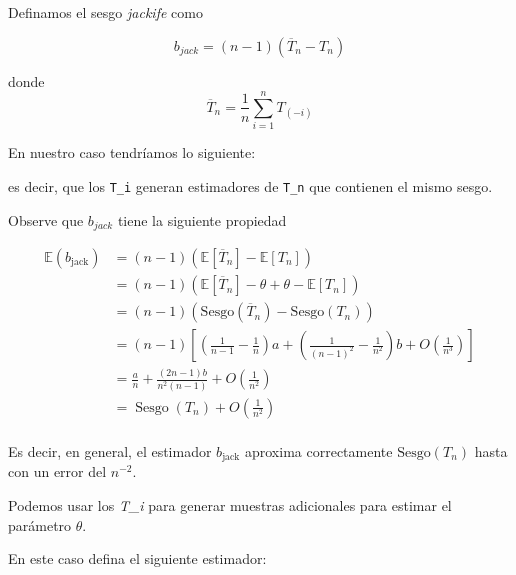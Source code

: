 \documentclass[12pt]{book}\usepackage[]{graphicx}\usepackage[]{color}
\theoremstyle{definition}
\theoremstyle{plain}
\begin{document}
Definamos el sesgo \emph{jackife} como



\begin{equation*}
b_{jack} = (n-1) (\overline{T}_{n} - T_{n})
\end{equation*}

donde
\begin{equation*}
\overline{T}_{n} = \frac{1}{n} \sum_{i=1}^{n} T_{(-i)}
\end{equation*}


\begin{laboratorio}{}{}
    En nuestro caso tendríamos lo siguiente:



    es decir, que los \texttt{T\_i} generan estimadores de \texttt{T\_n}
    que contienen el mismo sesgo.
\end{laboratorio}

Observe que \(b_{jack}\) tiene la siguiente propiedad


\begin{align*}
\mathbb{E}\left(b_{\text {jack}}\right)
&= (n-1)\left(\mathbb{E}\left[\overline{T}_{n}\right] -
\mathbb{E}\left[T_{n}\right]\right) \\
&= (n-1)\left(\mathbb{E}\left[\overline{T}_{n}\right] - \theta +
\theta - \mathbb{E}\left[T_{n}\right]\right) \\
& =(n-1)\left(\mathrm{Sesgo} \left(\overline{T}_{n}\right)
-\mathrm{Sesgo}\left(T_{n}\right)\right) \\
& =(n-1)\left[\left(\frac{1}{n-1}
-\frac{1}{n}\right)
a+\left(\frac{1}{(n-1)^{2}}
-\frac{1}{n^{2}}\right) b+O\left(\frac{1}{n^{3}}\right)\right] \\
& =\frac{a}{n}
+\frac{(2 n-1) b}{n^{2}(n-1)}
+O\left(\frac{1}{n^{2}}\right) \\
& =\operatorname{Sesgo}\left(T_{n}\right)
+O\left(\frac{1}{n^{2}}\right)\\
\end{align*}

\begin{nota}{}{}
    Es decir, en general, el estimador \(b_{\text{jack}}\)  aproxima
    correctamente \(\mathrm{Sesgo}\left( T_{n} \right)\) hasta con un
    error del \(n^{-2}\).
\end{nota}


Podemos usar los \emph{T\_i} para generar muestras adicionales para
estimar el parámetro \(\theta\).

En este caso  defina el siguiente estimador:
\end{document}
